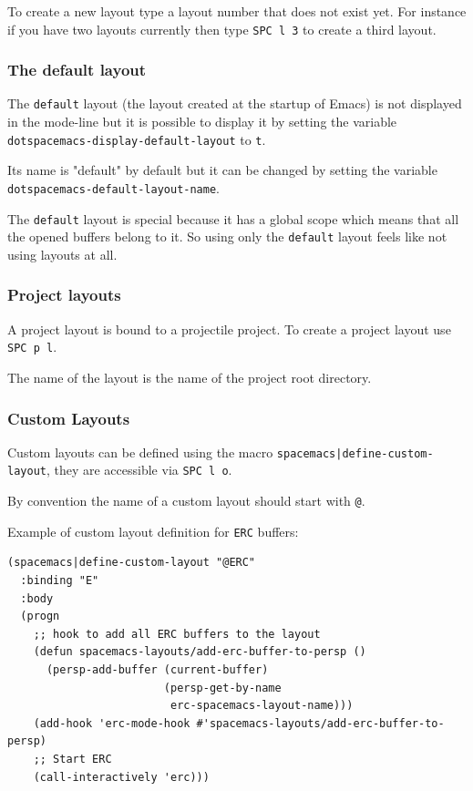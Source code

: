 \documentclass[11pt]{article}
\begin{document}
To create a new layout type a layout number that does not exist yet.
For instance if you have two layouts currently then type \texttt{SPC l 3} to create a
third layout.

\subsubsection{The default layout}
\label{sec:org31b22dd}
The \texttt{default} layout (the layout created at the startup of Emacs) is not
displayed in the mode-line but it is possible to display it by setting the
variable \texttt{dotspacemacs-display-default-layout} to \texttt{t}.

Its name is "default" by default but it can be changed by setting the variable
\texttt{dotspacemacs-default-layout-name}.

The \texttt{default} layout is special because it has a global scope which means that
all the opened buffers belong to it. So using only the \texttt{default} layout feels
like not using layouts at all.

\subsubsection{Project layouts}
\label{sec:org8d5ce86}
A project layout is bound to a projectile project. To create a project layout
use \texttt{SPC p l}.

The name of the layout is the name of the project root directory.

\subsubsection{Custom Layouts}
\label{sec:org5768222}
Custom layouts can be defined using the macro \texttt{spacemacs|define-custom-layout},
they are accessible via \texttt{SPC l o}.

By convention the name of a custom layout should start with \texttt{@}.

Example of custom layout definition for \texttt{ERC} buffers:

\begin{verbatim}
(spacemacs|define-custom-layout "@ERC"
  :binding "E"
  :body
  (progn
    ;; hook to add all ERC buffers to the layout
    (defun spacemacs-layouts/add-erc-buffer-to-persp ()
      (persp-add-buffer (current-buffer)
                        (persp-get-by-name
                         erc-spacemacs-layout-name)))
    (add-hook 'erc-mode-hook #'spacemacs-layouts/add-erc-buffer-to-persp)
    ;; Start ERC
    (call-interactively 'erc)))
\end{verbatim}
\end{document}
